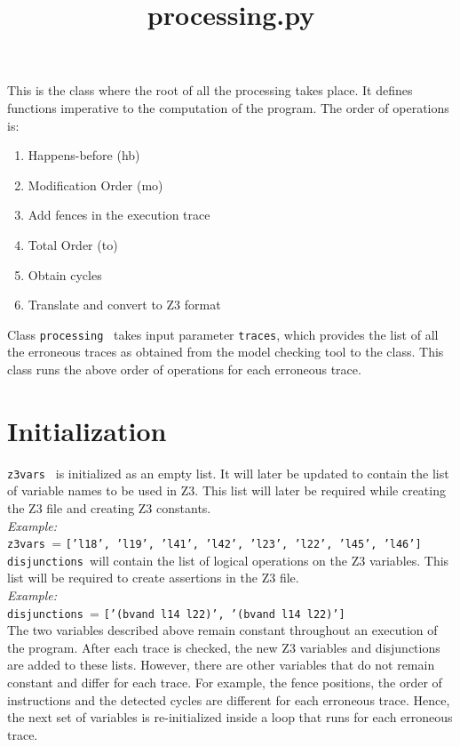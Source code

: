\documentclass{article}
\date{}
\newcommand{\var}[1]{\color{OliveGreen} \texttt{#1}\color{black}}
\newcommand{\varinfo}[1]{\scriptsize \texttt{#1} \normalsize}
\newcommand{\class}[1]{\color{DarkOrchid}\texttt{#1}\color{black}}
\begin{document}
\title{processing.py}
\maketitle

\par
This is the class where the root of all the processing takes place. It defines functions imperative to the computation of the program. The order of operations is:
\begin{enumerate}
    \item Happens-before (hb)
    \item Modification Order (mo)
    \item Add fences in the execution trace
    \item Total Order (to)
    \item Obtain cycles
    \item Translate and convert to Z3 format
\end{enumerate}
Class \class{processing } takes input parameter \var{traces}, which provides the list of all the erroneous traces as obtained from the model checking tool to the class. This class runs the above order of operations for each erroneous trace.

\section{Initialization}
\par
\var{z3vars } is initialized as an empty list. It will later be updated to contain the list of variable names to be used in Z3. This list will later be required while creating the Z3 file and creating Z3 constants.\\
\textit{Example:}\\
\var{z3vars }= \varinfo{['l18', 'l19', 'l41', 'l42', 'l23', 'l22', 'l45', 'l46']}\\

\var{disjunctions }will contain the list of logical operations on the Z3 variables. This list will be required to create assertions in the Z3 file.\\
\textit{Example:}\\
\var{disjunctions }= \varinfo{['(bvand l14 l22)', '(bvand l14 l22)']}\\

The two variables described above remain constant throughout an execution of the program. After each trace is checked, the new Z3 variables and disjunctions are added to these lists. However, there are other variables that do not remain constant and differ for each trace. For example, the fence positions, the order of instructions and the detected cycles are different for each erroneous trace. Hence, the next set of variables is re-initialized inside a loop that runs for each erroneous trace.\\
\end{document}

